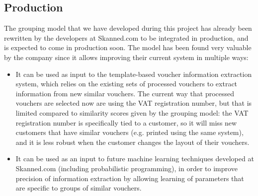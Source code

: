 \documentclass[12pt,a4paper]{article}
\begin{document}
\subsection{Production}
The grouping model that we have developed during this project has already been
rewritten by the developers at Skanned.com to be integrated in production, and
is expected to come in production soon.
The model has been found very valuable by the company since it allows improving their
current system in multiple ways:
\begin{itemize}
\item It can be used as input to the template-based voucher information
  extraction system, which relies on the existing sets of processed vouchers to extract
  information from new similar vouchers. The current way that processed vouchers
  are selected now are using the VAT registration number, but that is limited
  compared to similarity scores given by the grouping model: the
  VAT registration number is specifically tied to a customer, so it will
  miss new customers that have similar vouchers (e.g. printed using the same
  system), and it is less robust when the customer changes the layout of their vouchers.
\item It can be used as an input to future machine learning techniques developed
  at Skanned.com (including probabilistic programming), in order to improve
  precision of information extraction by allowing learning of parameters that
  are specific to groups of similar vouchers.
\end{itemize}
\end{document}
